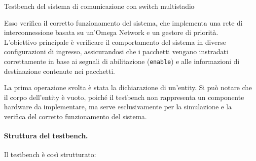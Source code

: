 \begin{code}
    \inputminted{vhdl}{vhdl/omega_network_tb.vhd}
    \caption{Testbench del sistema di comunicazione con switch multistadio}
    \label{cod:omega_network_tb}
\end{code}

Esso verifica il corretto funzionamento del sistema, che implementa una rete di interconnessione basata su un'Omega Network e un gestore di priorità. L'obiettivo principale è verificare il comportamento del sistema in diverse configurazioni di ingresso, assicurandosi che i pacchetti vengano instradati correttamente in base ai segnali di abilitazione (\texttt{enable}) e alle informazioni di destinazione contenute nei pacchetti.

La prima operazione svolta è stata la dichiarazione di un’entity. Si può notare che il corpo dell’entity è vuoto, poiché il testbench non rappresenta un componente hardware da implementare, ma serve esclusivamente per la simulazione e la verifica del corretto funzionamento del sistema.

\paragraph{Struttura del testbench.}
Il testbench è così strutturato:

